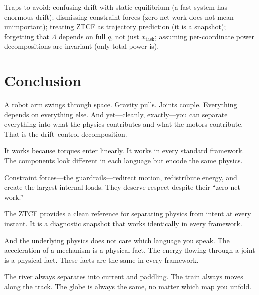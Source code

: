 \documentclass[11pt]{article}
\begin{document}
Traps to avoid: confusing drift with static equilibrium (a fast system has enormous drift); dismissing constraint forces (zero net work does not mean unimportant); treating ZTCF as trajectory prediction (it is a snapshot); forgetting that $\Lambda$ depends on full $q$, not just $x_{\mathrm{task}}$; assuming per-coordinate power decompositions are invariant (only total power is).


\section{Conclusion}\label{sec:conclusion}

A robot arm swings through space. Gravity pulls. Joints couple. Everything depends on everything else. And yet---cleanly, exactly---you can separate everything into what the physics contributes and what the motors contribute. That is the drift--control decomposition.

It works because torques enter linearly. It works in every standard framework. The components look different in each language but encode the same physics.

Constraint forces---the guardrails---redirect motion, redistribute energy, and create the largest internal loads. They deserve respect despite their ``zero net work.''

The ZTCF provides a clean reference for separating physics from intent at every instant. It is a diagnostic snapshot that works identically in every framework.

And the underlying physics does not care which language you speak. The acceleration of a mechanism is a physical fact. The energy flowing through a joint is a physical fact. These facts are the same in every framework.

The river always separates into current and paddling. The train always moves along the track. The globe is always the same, no matter which map you unfold.
\end{document}
